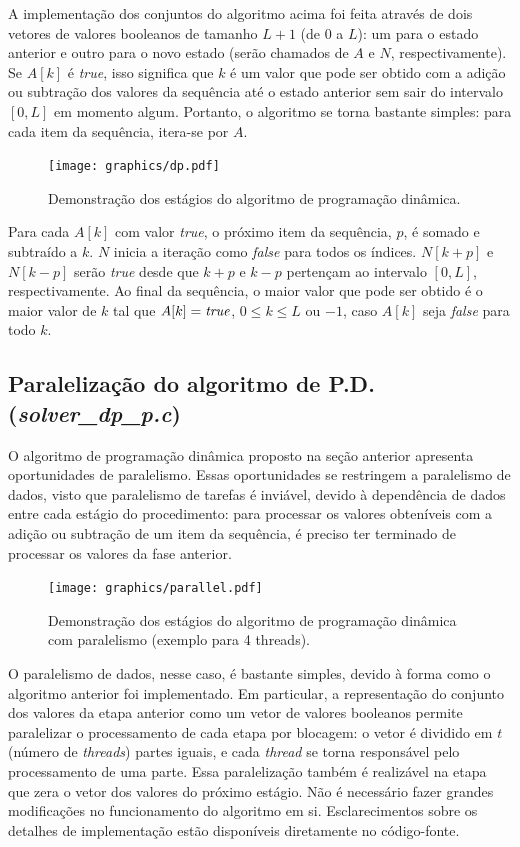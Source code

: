 \documentclass[10pt,a4paper]{article}
\numberwithin{equation}{section}
\begin{document}
A implementação dos conjuntos do algoritmo acima foi feita através de dois vetores de valores booleanos de tamanho $L + 1$ (de $0$ a $L$): um para o estado anterior e outro para o novo estado (serão chamados de $A$ e $N$, respectivamente). Se $A[k]$ é \emph{true}, isso significa que $k$ é um valor que pode ser obtido com a adição ou subtração dos valores da sequência até o estado anterior sem sair do intervalo $[0,L]$ em momento algum. Portanto, o algoritmo se torna bastante simples: para cada item da sequência, itera-se por $A$.

\begin{figure}[H]
    \centering
    \texttt{[image: graphics/dp.pdf]}
    \caption{Demonstração dos estágios do algoritmo de programação dinâmica.}
    \label{fig:dp}
\end{figure}

Para cada $A[k]$ com valor \emph{true}, o próximo item da sequência, $p$, é somado e subtraído a $k$. $N$ inicia a iteração como \emph{false} para todos os índices. $N[k+p]$ e $N[k-p]$ serão \emph{true} desde que $k+p$ e $k-p$ pertençam ao intervalo $[0,L]$, respectivamente. Ao final da sequência, o maior valor que pode ser obtido é o maior valor de $k$ tal que $A[k]=\text{\emph{true}}$, $0 \le k \le L$ ou $-1$, caso $A[k]$ seja \emph{false} para todo $k$.

\subsection{Paralelização do algoritmo de P.D. (\emph{solver\_dp\_p.c})}

O algoritmo de programação dinâmica proposto na seção anterior apresenta oportunidades de paralelismo. Essas oportunidades se restringem a paralelismo de dados, visto que paralelismo de tarefas é inviável, devido à dependência de dados entre cada estágio do procedimento: para processar os valores obteníveis com a adição ou subtração de um item da sequência, é preciso ter terminado de processar os valores da fase anterior.

\begin{figure}[H]
    \centering
    \texttt{[image: graphics/parallel.pdf]}
    \caption{Demonstração dos estágios do algoritmo de programação dinâmica com paralelismo (exemplo para 4 threads).}
    \label{fig:parallel}
\end{figure}

O paralelismo de dados, nesse caso, é bastante simples, devido à forma como o algoritmo anterior foi implementado. Em particular, a representação do conjunto dos valores da etapa anterior como um vetor de valores booleanos permite paralelizar o processamento de cada etapa por blocagem: o vetor é dividido em $t$ (número de \emph{threads}) partes iguais, e cada \emph{thread} se torna responsável pelo processamento de uma parte. Essa paralelização também é realizável na etapa que zera o vetor dos valores do próximo estágio. Não é necessário fazer grandes modificações no funcionamento do algoritmo em si. Esclarecimentos sobre os detalhes de implementação estão disponíveis diretamente no código-fonte.
\end{document}
